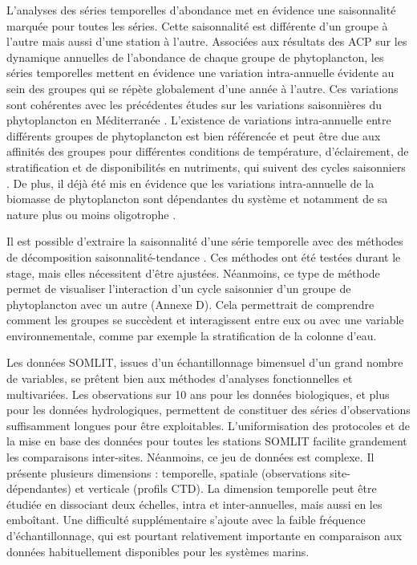 \documentclass[12pt]{article}
\begin{document}
L’analyses des séries temporelles d’abondance met en évidence une saisonnalité marquée pour toutes les séries. Cette saisonnalité est différente d’un groupe à l’autre mais aussi d’une station à l’autre.  Associées aux résultats des ACP sur les dynamique annuelles de l’abondance de chaque groupe de phytoplancton, les séries temporelles mettent en évidence une variation intra-annuelle évidente au sein des groupes qui se répète globalement d’une année à l’autre. Ces variations sont cohérentes avec les précédentes études sur les variations saisonnières du phytoplancton en Méditerranée \citep{Ribera2004, Bosc2004}. L’existence de variations intra-annuelle entre différents groupes de phytoplancton est bien référencée et peut être due aux affinités des groupes pour différentes conditions de température, d’éclairement, de stratification et de disponibilités en nutriments, qui suivent des cycles saisonniers \citep{Levasseur1984, Zubkov2000, Romagnan2015}.  De plus, il déjà été mis en évidence que les variations intra-annuelle de la biomasse de phytoplancton sont dépendantes du système et notamment de sa nature plus ou moins oligotrophe \citep{Sommer2012}. 

Il est possible d’extraire la saisonnalité d’une série temporelle avec des méthodes de décomposition saisonnalité-tendance \citep{Cleveland1990, Dokumentov2021}. Ces méthodes ont été testées durant le stage, mais elles nécessitent d’être ajustées. Néanmoins, ce type de méthode permet de visualiser l’interaction d’un cycle saisonnier d’un groupe de phytoplancton avec un autre (Annexe D). Cela permettrait de comprendre comment les groupes se succèdent et interagissent entre eux ou avec une variable environnementale, comme par exemple la stratification de la colonne d’eau.

Les données SOMLIT, issues d’un échantillonnage bimensuel d’un grand nombre de variables, se prêtent bien aux méthodes d’analyses fonctionnelles et multivariées. Les observations sur 10 ans pour les données biologiques, et plus pour les données hydrologiques, permettent de constituer des séries d’observations suffisamment longues pour être exploitables. L’uniformisation des protocoles et de la mise en base des données pour toutes les stations SOMLIT facilite grandement les comparaisons inter-sites. Néanmoins, ce jeu de données est complexe. Il présente plusieurs dimensions : temporelle, spatiale (observations site-dépendantes) et verticale (profils CTD).  La dimension temporelle peut être étudiée en dissociant deux échelles, intra et inter-annuelles, mais aussi en les emboîtant. Une difficulté supplémentaire s’ajoute avec la faible fréquence d’échantillonnage, qui est pourtant relativement importante en comparaison aux données habituellement disponibles pour les systèmes marins. 
\end{document}
